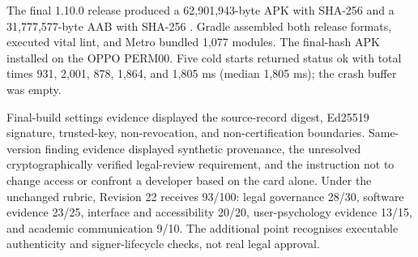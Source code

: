 The final 1.10.0 release produced a 62,901,943-byte APK with SHA-256 \texttt{} and a 31,777,577-byte AAB with SHA-256 \texttt{}. Gradle assembled both release formats, executed vital lint, and Metro bundled 1,077 modules. The final-hash APK installed on the OPPO PERM00. Five cold starts returned status ok with total times 931, 2,001, 878, 1,864, and 1,805 ms (median 1,805 ms); the crash buffer was empty.

Final-build settings evidence displayed the source-record digest, Ed25519 signature, trusted-key, non-revocation, and non-certification boundaries. Same-version finding evidence displayed synthetic provenance, the unresolved cryptographically verified legal-review requirement, and the instruction not to change access or confront a developer based on the card alone. Under the unchanged rubric, Revision 22 receives 93/100: legal governance 28/30, software evidence 23/25, interface and accessibility 20/20, user-psychology evidence 13/15, and academic communication 9/10. The additional point recognises executable authenticity and signer-lifecycle checks, not real legal approval.
